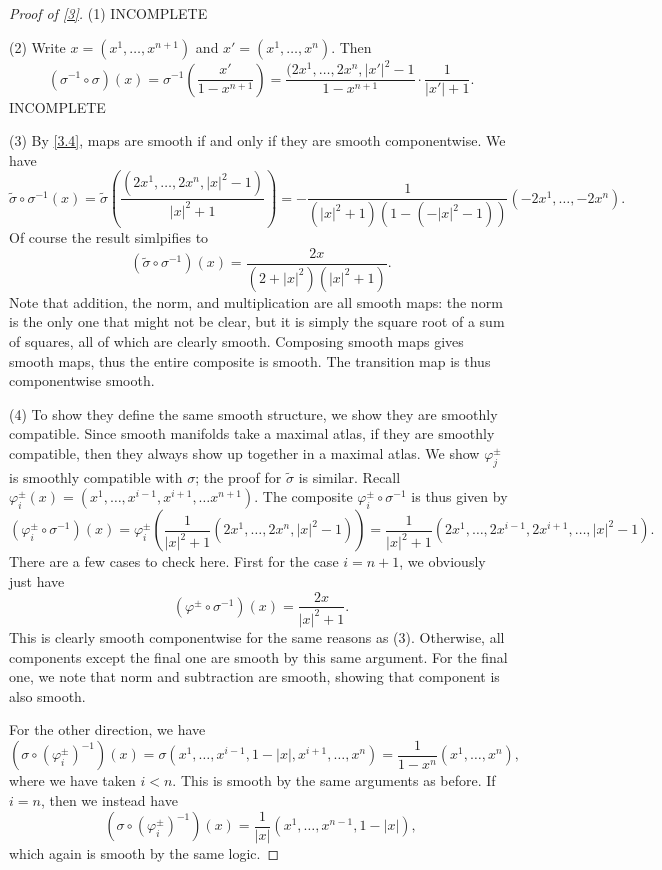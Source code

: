 \documentclass[11pt, letterpaper]{article}
\theoremstyle{theorem}
\begin{document}
\begin{proof}[Proof of \cref{3}]
	(1) INCOMPLETE

	(2) Write $x=(x^1, \ldots ,x^{n+1} )$ and $x'=(x^1, \ldots ,x^n)$. Then
	\[
		(\sigma ^{-1} \circ \sigma )(x)=\sigma ^{-1} \left(\frac{x'}{1-x^{n+1} } \right)=\frac{(2x^1, \ldots , 2x^n, \left| x' \right| ^2-1}{1-x^{n+1} }\cdot \frac{1}{\left| x' \right| +1} 
	.\]
	INCOMPLETE

	(3) By \cref{3.4}, maps are smooth if and only if they are smooth componentwise. We have
	\[
		\widetilde{\sigma } \circ \sigma ^{-1} (x)=\widetilde{\sigma } \left( \frac{\left( 2x^1, \ldots ,2x^n, \left| x \right| ^2-1 \right) }{\left| x \right| ^2+1}  \right) =-\frac{1}{\left( \left| x \right| ^2+1 \right) \left( 1-\left(-\left| x \right| ^2-1\right) \right) } \left( -2x^1, \ldots ,-2x^n \right) 
	.\]
	Of course the result simlpifies to
	\[
		(\widetilde{\sigma } \circ \sigma ^{-1} )(x)=\frac{2x}{\left(2+\left| x \right| ^2\right)\left( \left| x \right| ^2+1 \right) } 
	.\]
	Note that addition, the norm, and multiplication are all smooth maps: the norm is the only one that might not be clear, but it is simply the square root of a sum of squares, all of which are clearly smooth. Composing smooth maps gives smooth maps, thus the entire composite is smooth. The transition map is thus componentwise smooth.

	(4) To show they define the same smooth structure, we show they are smoothly compatible. Since smooth manifolds take a maximal atlas, if they are smoothly compatible, then they always show up together in a maximal atlas. We show $\varphi ^{\pm} _j$ is smoothly compatible with $\sigma $; the proof for $\widetilde{\sigma } $ is similar. Recall $\varphi _i^{\pm} (x)=(x^1, \ldots ,x^{i-1} ,x^{i+1} ,\ldots x^{n+1})$. The composite $\varphi _i^{\pm} \circ \sigma ^{-1} $ is thus given by
	\[
		(\varphi _i^\pm\circ \sigma ^{-1} )(x)=\varphi _i^{\pm} \left( \frac{1}{\left| x \right| ^2+1}   \left( 2x^1, \ldots ,2x^n, \left| x \right| ^2-1 \right) \right)=\frac{1}{\left| x \right|^2 +1} \left( 2x^1, \ldots ,2x^{i-1} ,2x^{i+1} ,\ldots ,\left| x \right| ^2-1 \right) 
	.\]
	There are a few cases to check here. First for the case $i=n+1$, we obviously just have
	\[
		(\varphi ^{\pm} \circ \sigma ^{-1} )(x)=\frac{2x}{\left| x \right| ^2+1} 
	.\]
	This is clearly smooth componentwise for the same reasons as (3). Otherwise, all components except the final one are smooth by this same argument. For the final one, we note that norm and subtraction are smooth, showing that component is also smooth.

	For the other direction, we have
	\[
		(\sigma \circ \left( \varphi _i^{\pm}  \right) ^{-1} )(x)=\sigma (x^1, \ldots ,x^{i-1} ,1-\left| x \right| ,x^{i+1} ,\ldots ,x^n)=\frac{1}{1-x^n} (x^1, \ldots ,x^n),
	\]
	where we have taken $i<n$. This is smooth by the same arguments as before. If $i=n$, then we instead have
	\[
		(\sigma \circ \left( \varphi _i^{\pm}  \right) ^{-1} )(x)=\frac{1}{\left| x \right| } (x^1, \ldots ,x^{n-1} , 1-\left| x \right| ),
	\]
	which again is smooth by the same logic.
\end{proof}
\end{document}

